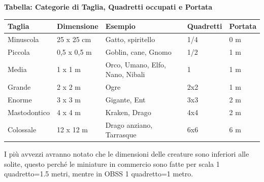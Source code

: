 \textbf{Tabella: Categorie di Taglia, Quadretti occupati e Portata}\label{tagliaedimensioni}\hypertarget{tagliaedimensioni}{}

\medskip

\noindent\begin{tabularx}{\linewidth}{Xllll}
	\toprule
\rowcolor{gray!20}\textbf{Taglia}& \textbf{Dimensione} & \textbf{Esempio}&\textbf{Quadretti}&\textbf{Portata}\\
\toprule
Minuscola & 25 x 25 cm&Gatto, spiritello& 1/4&0 m\\
\rowcolor{gray!20}Piccola & 0,5 x 0,5 m & Goblin, cane, Gnomo&1/2&1 m\\
Media & 1 x 1 m & Orco, Umano, Elfo, Nano, Nibali &1&1 m\\
\rowcolor{gray!20}Grande & 2 x 2 m& Ogre&2x2&1 m\\
Enorme & 3 x 3 m & Gigante, Ent&3x3&2 m\\
\rowcolor{gray!20}Mastodontico & 4 x 4 m&Kraken, Drago&4x4&2 m\\
Colossale & 12 x 12 m&Drago anziano, Tarrasque&6x6&6 m
\end{tabularx}

\medskip

I più avvezzi avranno notato che le dimensioni delle creature sono inferiori alle solite, questo perché le miniature in commercio sono fatte per scala 1 quadretto=1.5 metri, mentre in OBSS 1 quadretto=1 metro.

